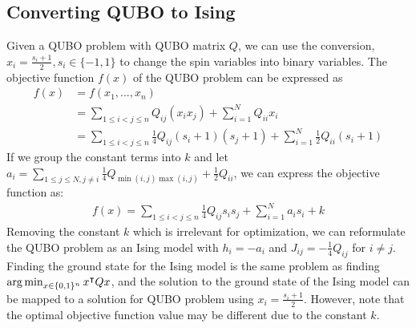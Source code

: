 \subsection{Converting QUBO to Ising}
Given a QUBO problem with QUBO matrix $Q$, we can use the conversion, $x_i = \frac{s_i + 1}{2}, s_i \in \{-1, 1\}$ to change the spin variables into binary variables. The objective function $f(x)$ of the QUBO problem can be expressed as
\begin{align}
    f(x) &= f(x_1, ..., x_n) \nonumber\\
    &= \sum_{1\leq i < j \leq n} Q_{ij}(x_i x_j) + \sum_{i=1}^N Q_{ii} x_i \nonumber \\
    &= \sum_{1\leq i < j \leq n} \frac{1}{4} Q_{ij}(s_i + 1)(s_j + 1) + \sum_{i=1}^N \frac{1}{2} Q_{ii} (s_i + 1) \nonumber
\end{align}
If we group the constant terms into $k$ and let $a_i = \sum_{1\leq j \leq N, j \neq i} \frac{1}{4}Q_{\min(i,j)\max(i,j)} + \frac{1}{2}Q_{ii}$, we can express the objective function as:
\begin{align}
    f(x) = \sum_{1\leq i < j \leq n} \frac{1}{4} Q_{ij}s_i s_j + \sum_{i=1}^N a_i s_i + k \nonumber
\end{align}
Removing the constant $k$ which is irrelevant for optimization, we can reformulate the QUBO problem as an Ising model with $h_i = -a_i$ and $J_{ij} = -\frac{1}{4}Q_{ij}$ for $i \neq j$. Finding the ground state for the Ising model is the same problem as finding $\operatorname*{arg\,min}_{x \in \{0, 1\}^n} x^\intercal Q x$, and the solution to the ground state of the Ising model can be mapped to a solution for QUBO problem using $x_i = \frac{s_i + 1}{2}$. However, note that the optimal objective function value may be different due to the constant $k$.

